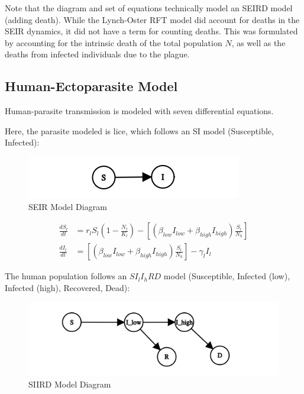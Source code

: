 \documentclass [letterpaper, 12pt] {article}
\begin{document}
Note that the diagram and set of equations technically model an SEIRD model (adding death). While the Lynch-Oster RFT model did account for deaths in the SEIR dynamics, it did not have a term for counting deaths. This was formulated by accounting for the intrinsic death of the total population $N$, as well as the deaths from infected individuals due to the plague.

\subsection {Human-Ectoparasite Model}
Human-parasite transmission is modeled with seven differential equations.

Here, the parasite modeled is lice, which follows an SI model (Susceptible, Infected):

\begin{figure}[H]
	\centering
	\includegraphics[width=0.55\linewidth]{sI-graph}
	\caption{SEIR Model Diagram}
\end{figure}

\vspace{-0.2cm}

\begin{align}
	\frac{dS_l}{dt} & = r_l S_l \left( 1 - \frac{N_l}{K_l} \right) - \left[ \left( \beta_{low} I_{low} + \beta_{high} I_{high} \right) \frac{S_l}{N_h} \right] \\
	\frac{dI_l}{dt} & = \left[ \left( \beta_{low} I_{low} + \beta_{high} I_{high} \right) \frac{S_l}{N_h} \right] - \gamma_l I_l
\end{align}

The human population follows an $S I_l I_h R D$ model (Susceptible, Infected (low), Infected (high), Recovered, Dead):

\begin{figure}[H]
	\centering
	\includegraphics[width=0.75\linewidth]{siird-graph.png}
	\caption{SIIRD Model Diagram}
\end{figure}
\end{document}

